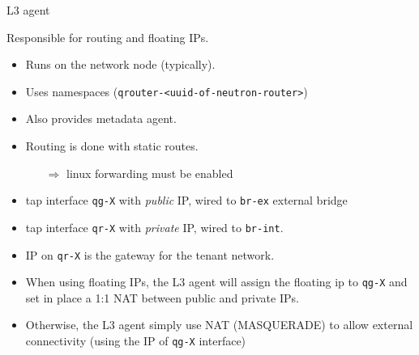\documentclass[english,serif,mathserif,xcolor=pdftex,dvipsnames,table]{beamer}
\begin{document}
\begin{frame}
  {L3 agent}

  Responsible for routing and floating IPs.

\scriptsize  \begin{itemize}
  \item Runs on the network node (typically).

  \item Uses namespaces (\texttt{qrouter-<uuid-of-neutron-router>})

  \item Also provides metadata agent.

  \item Routing is done with static routes.
    \begin{itemize}\scriptsize
    \item[$\Rightarrow$] linux forwarding must be enabled
    \end{itemize}
  \item tap interface \texttt{qg-X} with \textit{public} IP, wired to
    \texttt{br-ex} external bridge

  \item tap interface \texttt{qr-X} with \textit{private} IP, wired to
    \texttt{br-int}.

  \item IP on \texttt{qr-X} is the gateway for the tenant network.

  \item When using floating IPs, the L3 agent will assign the floating
    ip to \texttt{qg-X} and set in place a 1:1 NAT between public and
    private IPs.

  \item Otherwise, the L3 agent simply use NAT (MASQUERADE) to allow
    external connectivity (using the IP of \texttt{qg-X} interface)
  \end{itemize}
\end{frame}
\end{document}

